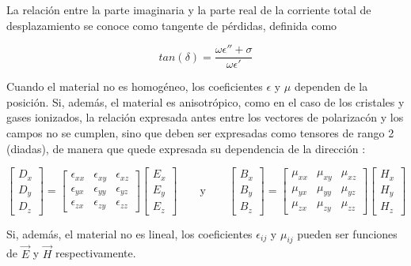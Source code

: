 La relación entre la parte imaginaria y la parte real de la corriente total de desplazamiento se conoce como tangente de pérdidas, definida como \cite{Pozar:MwEngineering}

\begin{equation}
	tan (\delta) = \frac{\omega \epsilon'' + \sigma}{\omega \epsilon'}
\end{equation}

Cuando el material no es homogéneo, los coeficientes $\epsilon$ y $\mu$ dependen de la posición. Si, además, el material es anisotrópico, como en el caso de los cristales y gases ionizados, la relación expresada antes entre los vectores de polarizacón y los campos no se cumplen, sino que deben ser expresadas como tensores de rango 2 (diadas), de manera que quede expresada su dependencia de la dirección \cite{Collin:GuidedWaves}:

\begin{equation}
\begin{bmatrix}
D_x \\
D_y \\
D_z
\end{bmatrix}
=
\begin{bmatrix}
\epsilon_{xx} & \epsilon_{xy} & \epsilon_{xz} \\
\epsilon_{yx} & \epsilon_{yy} & \epsilon_{yz} \\
\epsilon_{zx} & \epsilon_{zy} & \epsilon_{zz}
\end{bmatrix}
\begin{bmatrix}
E_x \\
E_y \\
E_z
\end{bmatrix}
\qquad\text{y}\qquad
\begin{bmatrix}
B_x \\
B_y \\
B_z
\end{bmatrix}
=
\begin{bmatrix}
\mu_{xx} & \mu_{xy} & \mu_{xz} \\
\mu_{yx} & \mu_{yy} & \mu_{yz} \\
\mu_{zx} & \mu_{zy} & \mu_{zz}
\end{bmatrix}
\begin{bmatrix}
H_x \\
H_y \\
H_z
\end{bmatrix}
\end{equation}

Si, además, el material no es lineal, los coeficientes $\epsilon_{ij}$ y $\mu_{ij}$ pueden ser funciones de $\vec{E}$ y $\vec{H}$ respectivamente.
